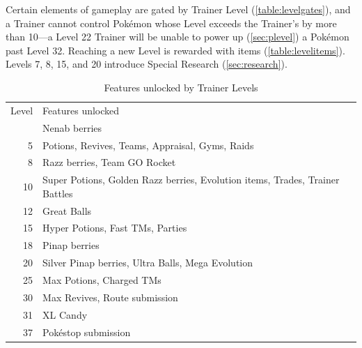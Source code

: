 Certain elements of gameplay are gated by Trainer Level (\autoref{table:levelgates}),
  and a Trainer cannot control Pokémon whose Level exceeds the Trainer's
  by more than 10---a Level 22 Trainer will be unable to power up (\autoref{sec:plevel}) a Pokémon past Level 32.
Reaching a new Level is rewarded with items (\autoref{table:levelitems}).
Levels 7, 8, 15, and 20 introduce Special Research (\autoref{sec:research}).
\begin{table}[ht]
  \centering
  \begin{tabular}{r p{}}
  Level & Features unlocked \\
\Midrule
  2 & Nenab berries \\
  5 & Potions, Revives, Teams, Appraisal, Gyms, Raids \\
  8 & Razz berries, Team GO Rocket \\
  10 & Super Potions, Golden Razz berries, Evolution items, Trades, Trainer Battles \\
  12 & Great Balls \\
  15 & Hyper Potions, Fast TMs, Parties \\
  18 & Pinap berries \\
  20 & Silver Pinap berries, Ultra Balls, Mega Evolution \\
  25 & Max Potions, Charged TMs \\
  30 & Max Revives, Route submission \\
  31 & XL Candy \\
  37 & Pokéstop submission \\
\end{tabular}
\caption{Features unlocked by Trainer Levels}
\label{table:levelgates}
\end{table}
